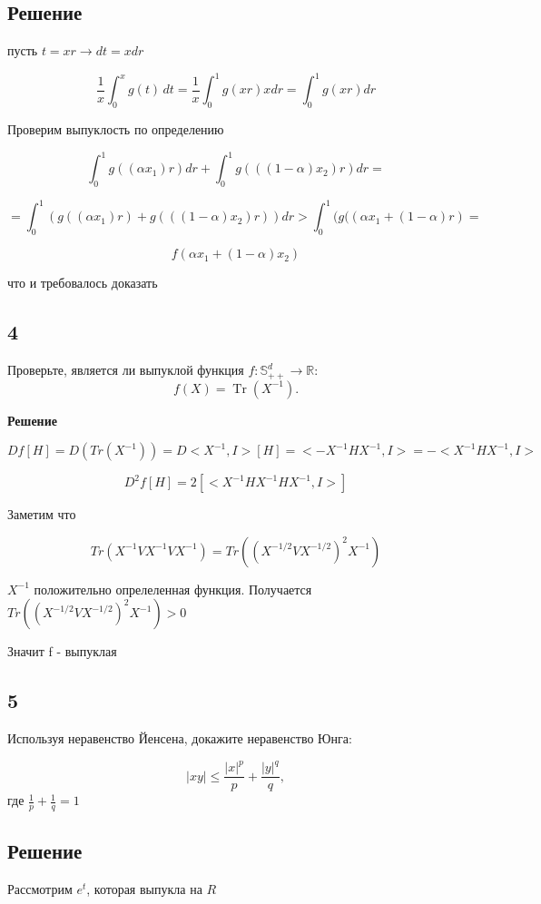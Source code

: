 \documentclass{article}
\DeclareMathOperator{\Tr}{Tr}
\begin{document}
\subsection*{Решение}

пусть $t = xr \rightarrow dt = xdr$

$$
\frac{1}{x} \int_0^x g(t) \, dt = \frac{1}{x} \int_0^1 g(xr) x dr = \int_0^1 g(xr)dr
$$

Проверим выпуклость по определению


$$
\int_0^1 g((\alpha x_1)r)dr + \int_0^1 g(((1 -\alpha) x_2)r)dr = 
$$

$$
= \int_0^1 (g((\alpha x_1)r) +  g(((1 -\alpha) x_2)r))dr > \int_0^1 (g((\alpha x_1 + (1 - \alpha)r) =
$$

$$
f(\alpha x_1 + (1 - \alpha)x_2)
$$

что и требовалось доказать



\subsection*{4} Проверьте, является ли выпуклой функция \( f : \mathbb{S}_{++}^d \to \mathbb{R} \):
\[
f(X) = \Tr(X^{-1}).
\]

\textbf{Решение}

$$
Df[H] = D(Tr(X^{-1})) = D<X^{-1}, I>[H] = <-X^{-1}HX^{-1}, I> = -<X^{-1}HX^{-1}, I>
$$

$$
D^2f[H] =2[<X^{-1}HX^{-1} HX^{-1}, I>]
$$

Заметим что

$$
Tr(X^{-1}VX^{-1}VX^{-1}) = Tr((X^{-1/2}VX^{-1/2})^2 X^{-1})
$$

$X^{-1}$ положительно опрелеленная функция. Получается $Tr((X^{-1/2}VX^{-1/2})^2 X^{-1}) > 0$

Значит f - выпуклая


\subsection*{5}

Используя неравенство Йенсена, докажите неравенство Юнга:

\[
|xy| \leq \frac{|x|^p}{p} + \frac{|y|^q}{q},
\]
где $\frac{1}{p} + \frac{1}{q} = 1$

\subsection*{Решение}

Рассмотрим $e^t$, которая выпукла на $R$
\end{document}
